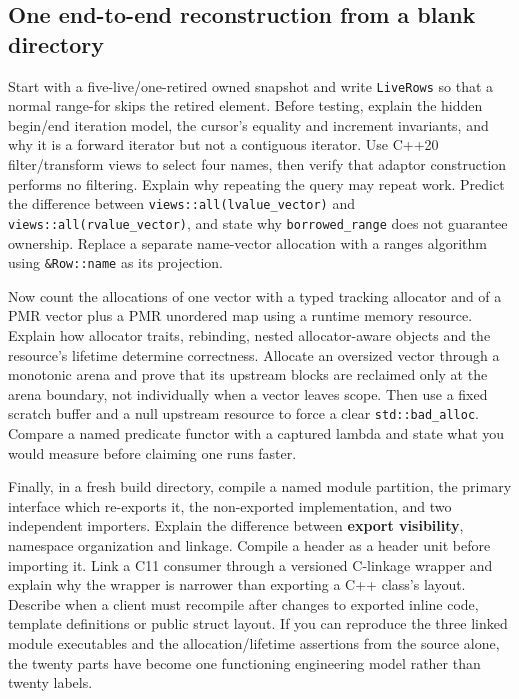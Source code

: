 \subsection{One end-to-end reconstruction from a blank directory}\label{01-foundations-i-ch006-one-end-to-end-reconstruction-from-a-blank-directory}

Start with a five-live/one-retired owned snapshot and write \texttt{LiveRows} so that a normal range-for skips the retired element. Before testing, explain the hidden begin/end iteration model, the cursor's equality and increment invariants, and why it is a forward iterator but not a contiguous iterator. Use C++20 filter/transform views to select four names, then verify that adaptor construction performs no filtering. Explain why repeating the query may repeat work. Predict the difference between \texttt{views::all(lvalue\_vector)} and \texttt{views::all(rvalue\_vector)}, and state why \texttt{borrowed\_range} does not guarantee ownership. Replace a separate name-vector allocation with a ranges algorithm using \texttt{\&Row::name} as its projection.

Now count the allocations of one vector with a typed tracking allocator and of a PMR vector plus a PMR unordered map using a runtime memory resource. Explain how allocator traits, rebinding, nested allocator-aware objects and the resource's lifetime determine correctness. Allocate an oversized vector through a monotonic arena and prove that its upstream blocks are reclaimed only at the arena boundary, not individually when a vector leaves scope. Then use a fixed scratch buffer and a null upstream resource to force a clear \texttt{std::bad\_alloc}. Compare a named predicate functor with a captured lambda and state what you would measure before claiming one runs faster.

Finally, in a fresh build directory, compile a named module partition, the primary interface which re-exports it, the non-exported implementation, and two independent importers. Explain the difference between \textbf{export visibility}, namespace organization and linkage. Compile a header as a header unit before importing it. Link a C11 consumer through a versioned C-linkage wrapper and explain why the wrapper is narrower than exporting a C++ class's layout. Describe when a client must recompile after changes to exported inline code, template definitions or public struct layout. If you can reproduce the three linked module executables and the allocation/lifetime assertions from the source alone, the twenty parts have become one functioning engineering model rather than twenty labels.

